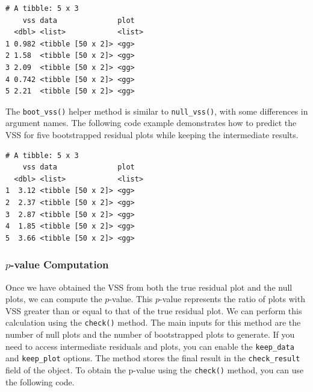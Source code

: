 \documentclass[
doublespace,
  times]{anzsauth}
\newenvironment{Shaded}{\begin{snugshade}}{\end{snugshade}}
\newcommand{\AttributeTok}[1]{\textcolor[rgb]{0.40,0.45,0.13}{#1}}
\newcommand{\ConstantTok}[1]{\textcolor[rgb]{0.56,0.35,0.01}{#1}}
\newcommand{\DecValTok}[1]{\textcolor[rgb]{0.68,0.00,0.00}{#1}}
\newcommand{\FunctionTok}[1]{\textcolor[rgb]{0.28,0.35,0.67}{#1}}
\newcommand{\NormalTok}[1]{\textcolor[rgb]{0.00,0.23,0.31}{#1}}
\newcommand{\SpecialCharTok}[1]{\textcolor[rgb]{0.37,0.37,0.37}{#1}}
\begin{document}
\begin{Shaded}
\end{Shaded}

\begin{verbatim}
# A tibble: 5 x 3
    vss data              plot  
  <dbl> <list>            <list>
1 0.982 <tibble [50 x 2]> <gg>  
2 1.58  <tibble [50 x 2]> <gg>  
3 2.09  <tibble [50 x 2]> <gg>  
4 0.742 <tibble [50 x 2]> <gg>  
5 2.21  <tibble [50 x 2]> <gg>  
\end{verbatim}

The \texttt{boot\_vss()} helper method is similar to
\texttt{null\_vss()}, with some differences in argument names. The
following code example demonstrates how to predict the VSS for five
bootstrapped residual plots while keeping the intermediate results.

\begin{Shaded}
\end{Shaded}

\begin{verbatim}
# A tibble: 5 x 3
    vss data              plot  
  <dbl> <list>            <list>
1  3.12 <tibble [50 x 2]> <gg>  
2  2.37 <tibble [50 x 2]> <gg>  
3  2.87 <tibble [50 x 2]> <gg>  
4  1.85 <tibble [50 x 2]> <gg>  
5  3.66 <tibble [50 x 2]> <gg>  
\end{verbatim}

\subsubsection{\texorpdfstring{\(p\)-value
Computation}{p-value Computation}}\label{p-value-computation}

Once we have obtained the VSS from both the true residual plot and the
null plots, we can compute the \(p\)-value. This \(p\)-value represents
the ratio of plots with VSS greater than or equal to that of the true
residual plot. We can perform this calculation using the
\texttt{check()} method. The main inputs for this method are the number
of null plots and the number of bootstrapped plots to generate. If you
need to access intermediate residuals and plots, you can enable the
\texttt{keep\_data} and \texttt{keep\_plot} options. The method stores
the final result in the \texttt{check\_result} field of the object. To
obtain the p-value using the \texttt{check()} method, you can use the
following code.
\end{document}
